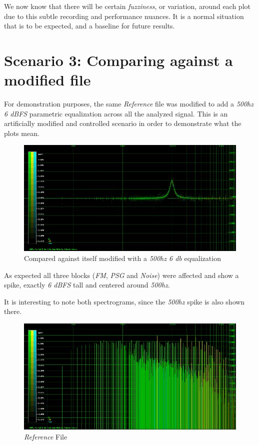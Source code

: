 \documentclass[10pt,a4paper]{report}
\begin{document}
We now know that there will be certain \textit{fuzziness}, or variation, around each plot due to this subtle recording and performance nuances. It is a normal situation that is to be expected, and a baseline for future results.

\section{Scenario 3: Comparing against a modified file}

For demonstration purposes, the same \textit{Reference} file was modified to add a \textit{500hz 6 dBFS} parametric equalization across all the analyzed signal. This is an artificially modified and controlled scenario in order to demonstrate what the plots mean.

\begin{figure}[H]
	\centering
	\includegraphics[width=1.0\linewidth]{plots/Plot3-Modified.png}
	\caption[1khz modified]{Compared against itself modified with a \textit{500hz 6 db} equalization}
	\label{fig:plot3-modified}
\end{figure}

As expected all three blocks (\textit{FM}, \textit{PSG} and \textit{Noise}) were affected and show a spike, exactly \textit{6 dBFS} tall and centered around \textit{500hz}.

It is interesting to note both spectrograms, since the \textit{500hz} spike is also shown there.

\begin{figure}[H]
	\centering
	\includegraphics[width=1.0\linewidth]{plots/Plot3-Spectrogram.png}
	\caption[Reference File]{\textit{Reference} File}
	\label{fig:plot3-spectrogram}
\end{figure}
\end{document}

